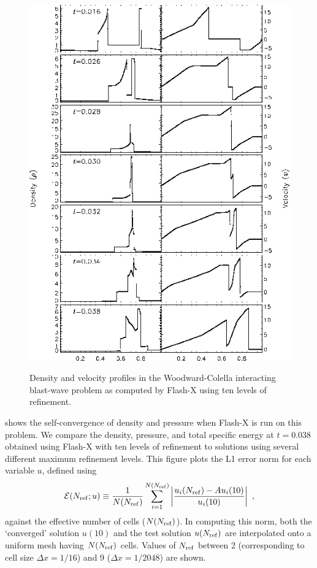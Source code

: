 \begin{figure}
\begin{center}
{\leavevmode\includegraphics[width=5in]{Blast2_soln}}
\end{center}
\caption{\label{Fig:WC solution} Density and velocity
profiles in the Woodward-Colella
interacting blast-wave problem  as computed by Flash-X using ten levels of
refinement.
}
\end{figure}

 shows the self-convergence of density
and pressure when Flash-X is run on this problem. We compare the
density, pressure, and total specific energy at $t=0.038$ obtained
using Flash-X with ten levels of refinement to solutions using several
different maximum refinement levels. This figure plots the L1 error
norm for each variable $u$, defined using
\begin{equation}
\label{Eqn:L1 error norm}
{\cal E}(N_{\rm ref};u) \equiv {1\over N(N_{\rm ref})}
\sum_{i=1}^{N(N_{\rm ref})}\left|{u_i(N_{\rm ref}) -
A
    u_i(10)\over u_i(10)}\right|\ ,
\end{equation}
against the effective number of cells
($N(N_{\rm ref})$).
In computing this norm, both the `converged' solution $u(10)$ and
the test solution $u(N_{\rm ref})$ are interpolated onto a uniform
mesh having $N(N_{\rm ref})$ cells.
Values of
$N_{\rm ref}$ between 2 (corresponding to cell size $\Delta x=1/16$)
and 9 ($\Delta x=1/2048$) are shown.

